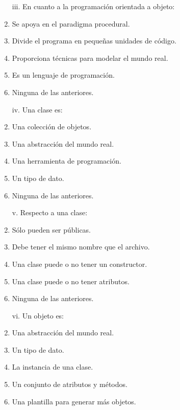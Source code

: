 \documentclass[10pt]{article}
\begin{document}
{\begin{enumerate}
\begin{multicols}{2}
    \begin{enumerate}[label=(\alph*)]
        \item[iii.] En cuanto a la programaci\'on orientada a objeto:
        \item Se apoya en el paradigma procedural.
        \item Divide el programa en peque\~nas unidades de c\'odigo.
        \item Proporciona t\'ecnicas para modelar el mundo real.
        \item Es un lenguaje de programaci\'on.
        \item Ninguna de las anteriores.
    \end{enumerate}

    \begin{enumerate}[label=(\alph*)]
        \item[iv.] Una clase es: 
        \item Una colecci\'on de objetos.
        \item Una abstracci\'on del mundo real.
        \item Una herramienta de programaci\'on.
        \item Un tipo de dato.
        \item Ninguna de las anteriores.
    \end{enumerate}

    \begin{enumerate}[label=(\alph*)]
        \item[v.] Respecto a una clase:
        \item S\'olo pueden ser p\'ublicas.
        \item Debe tener el mismo nombre que el archivo.
        \item Una clase puede o no tener un constructor.
        \item Una clase puede o no tener atributos.
        \item Ninguna de las anteriores.
    \end{enumerate}

    \begin{enumerate}[label=(\alph*)]
        \item[vi.] Un objeto es: 
        \item Una abstracci\'on del mundo real.
        \item Un tipo de dato.
        \item La instancia de una clase.
        \item Un conjunto de atributos y m\'etodos.
        \item Una plantilla para generar m\'as objetos.
    \end{enumerate}


\end{multicols}
\end{enumerate}}
\end{document}
